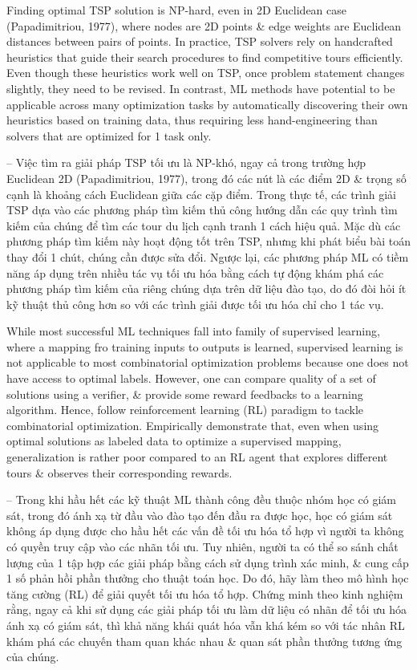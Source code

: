 \documentclass{article}
\begin{document}
\begin{itemize}
    Finding optimal TSP solution is NP-hard, even in 2D Euclidean case (Papadimitriou, 1977), where nodes are 2D points \& edge weights are Euclidean distances between pairs of points. In practice, TSP solvers rely on handcrafted heuristics that guide their search procedures to find competitive tours efficiently. Even though these heuristics work well on TSP, once problem statement changes slightly, they need to be revised. In contrast, ML methods have potential to be applicable across many optimization tasks by automatically discovering their own heuristics based on training data, thus requiring less hand-engineering than solvers that are optimized for 1 task only.
    
    -- Việc tìm ra giải pháp TSP tối ưu là NP-khó, ngay cả trong trường hợp Euclidean 2D (Papadimitriou, 1977), trong đó các nút là các điểm 2D \& trọng số cạnh là khoảng cách Euclidean giữa các cặp điểm. Trong thực tế, các trình giải TSP dựa vào các phương pháp tìm kiếm thủ công hướng dẫn các quy trình tìm kiếm của chúng để tìm các tour du lịch cạnh tranh 1 cách hiệu quả. Mặc dù các phương pháp tìm kiếm này hoạt động tốt trên TSP, nhưng khi phát biểu bài toán thay đổi 1 chút, chúng cần được sửa đổi. Ngược lại, các phương pháp ML có tiềm năng áp dụng trên nhiều tác vụ tối ưu hóa bằng cách tự động khám phá các phương pháp tìm kiếm của riêng chúng dựa trên dữ liệu đào tạo, do đó đòi hỏi ít kỹ thuật thủ công hơn so với các trình giải được tối ưu hóa chỉ cho 1 tác vụ.
    
    While most successful ML techniques fall into family of supervised learning, where a mapping fro training inputs to outputs is learned, supervised learning is not applicable to most combinatorial optimization problems because one does not have access to optimal labels. However, one can compare quality of a set of solutions using a verifier, \& provide some reward feedbacks to a learning algorithm. Hence, follow reinforcement learning (RL) paradigm to tackle combinatorial optimization. Empirically demonstrate that, even when using optimal solutions as labeled data to optimize a supervised mapping, generalization is rather poor compared to an RL agent that explores different tours \& observes their corresponding rewards.
    
    -- Trong khi hầu hết các kỹ thuật ML thành công đều thuộc nhóm học có giám sát, trong đó ánh xạ từ đầu vào đào tạo đến đầu ra được học, học có giám sát không áp dụng được cho hầu hết các vấn đề tối ưu hóa tổ hợp vì người ta không có quyền truy cập vào các nhãn tối ưu. Tuy nhiên, người ta có thể so sánh chất lượng của 1 tập hợp các giải pháp bằng cách sử dụng trình xác minh, \& cung cấp 1 số phản hồi phần thưởng cho thuật toán học. Do đó, hãy làm theo mô hình học tăng cường (RL) để giải quyết tối ưu hóa tổ hợp. Chứng minh theo kinh nghiệm rằng, ngay cả khi sử dụng các giải pháp tối ưu làm dữ liệu có nhãn để tối ưu hóa ánh xạ có giám sát, thì khả năng khái quát hóa vẫn khá kém so với tác nhân RL khám phá các chuyến tham quan khác nhau \& quan sát phần thưởng tương ứng của chúng.
    

\end{itemize}
\end{document}
